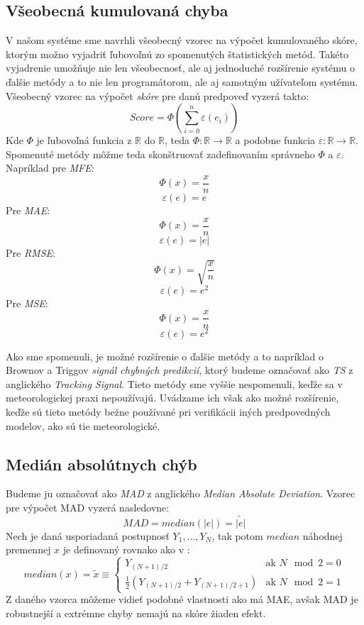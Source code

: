 \subsection{Všeobecná kumulovaná chyba}
\label{subsec:cumulativeerror}
V našom systéme sme navrhli všeobecný vzorec na výpočet kumulovaného skóre, ktorým možno vyjadriť ľubovoľnú zo spomenutých štatistických metód. Takéto vyjadrenie umožňuje nie len všeobecnosť, ale aj jednoduché rozšírenie systému o ďalšie metódy a to nie len programátorom, ale aj samotným užívateľom systému.
\\
Všeobecný vzorec na výpočet \textit{skóre} pre danú predpoveď vyzerá takto:
\[
	Score = \Phi(\sum\limits_{i=0}^{n} \varepsilon(e_i))  
\]
Kde $ \Phi $ je ľubovoľná funkcia z $\mathbb{R}$ do $\mathbb{R}$, teda $ \Phi : \mathbb{R} \rightarrow \mathbb{R} $ a podobne funkcia $ \varepsilon : \mathbb{R} \rightarrow \mathbb{R} $.
Spomenuté metódy môžme teda skonštruovať zadefinovaním správneho $ \Phi $ a $ \varepsilon $. \\
Napríklad pre \textit{MFE}:
\[ \Phi(x) = \frac{x}{n} \]
\[ \varepsilon(e) = e \] 
Pre \textit{MAE}:
\[ \Phi(x) = \frac{x}{n} \]
\[ \varepsilon(e) = \lvert e \rvert \]
Pre \textit{RMSE}:
\[ \Phi(x) = \sqrt{\frac{x}{n}} \]
\[\varepsilon(e) = e^2 \]
Pre \textit{MSE}:
\[ \Phi(x) = \frac{x}{n} \]
\[ \varepsilon(e) = e^2 \] 

Ako sme spomenuli, je možné rozšírenie o ďalšie metódy a to napríklad o Brownov a Triggov \textit{signál chybných predikcií}, ktorý budeme označovať ako \textit{TS} z anglického \textit{Tracking Signal}. Tieto metódy sme vyššie nespomenuli, keďže sa v meteorologickej praxi nepoužívajú. Uvádzame ich však ako možné rozšírenie, keďže sú tieto metódy bežne používané pri verifikácii iných predpovedných modelov, ako sú tie meteorologické.

\subsection{Medián absolútnych chýb}
\label{subsec:mad}
Budeme ju označovať ako \textit{MAD} z anglického \textit{Median Absolute Deviation}. Vzorec pre výpočet MAD vyzerá nasledovne:
\[
	MAD = median( \lvert e  \rvert) = \tilde{ \lvert e  \rvert}
\]
Nech je daná usporiadaná postupnosť $ Y_1, \ldots , Y_N $, tak potom $ median $ náhodnej premennej $ x $ je definovaný rovnako ako v \cite{StatMedian}:
\[
	median(x) = \tilde{x} \equiv \left\{
		\begin{array}{ll}
			Y_{(N+1)/2}  & \mbox{ak } N\mod{2} = 0 \\
			\frac{1}{2}(Y_{(N+1)/2} + Y_{(N+1)/2 + 1}) & \mbox{ak } N\mod{2} = 1
		\end{array}
	\right.
\]
Z daného vzorca môžeme vidieť podobné vlastnosti ako má MAE, avšak MAD je robustnejší a extrémne chyby nemajú na skóre žiaden efekt.

